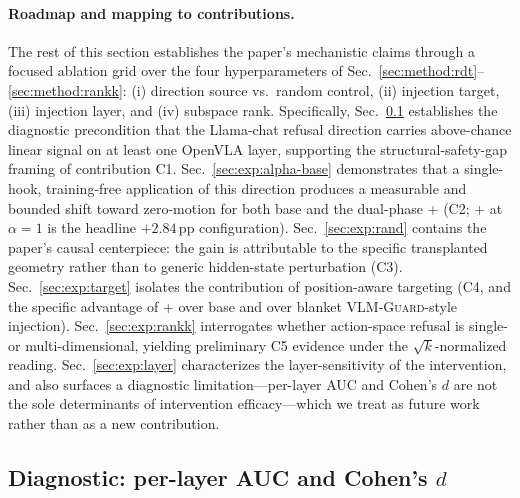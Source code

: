 \paragraph{Roadmap and mapping to contributions.}
The rest of this section establishes the paper's mechanistic claims through a focused ablation grid over the four hyperparameters of Sec.~\ref{sec:method:rdt}--\ref{sec:method:rankk}: (i) direction source vs.\ random control, (ii) injection target, (iii) injection layer, and (iv) subspace rank. Specifically, Sec.~\ref{sec:exp:diagnostic} establishes the diagnostic precondition that the Llama-chat refusal direction carries above-chance linear signal on at least one OpenVLA layer, supporting the structural-safety-gap framing of contribution C1. Sec.~\ref{sec:exp:alpha-base} demonstrates that a single-hook, training-free application of this direction produces a measurable and bounded shift toward zero-motion for both base \method{} and the dual-phase \method{}+ (C2; \method{}+ at $\alpha{=}1$ is the headline $+2.84$\,pp configuration). Sec.~\ref{sec:exp:rand} contains the paper's causal centerpiece: the gain is attributable to the specific transplanted geometry rather than to generic hidden-state perturbation (C3). Sec.~\ref{sec:exp:target} isolates the contribution of position-aware targeting (C4, and the specific advantage of \method{}+ over base \method{} and over blanket \textsc{VLM-Guard}-style injection). Sec.~\ref{sec:exp:rankk} interrogates whether action-space refusal is single- or multi-dimensional, yielding preliminary C5 evidence under the $\sqrt{k}$-normalized reading. Sec.~\ref{sec:exp:layer} characterizes the layer-sensitivity of the intervention, and also surfaces a diagnostic limitation---per-layer AUC and Cohen's $d$ are not the sole determinants of intervention efficacy---which we treat as future work rather than as a new contribution.

\subsection{Diagnostic: per-layer AUC and Cohen's $d$}
\label{sec:exp:diagnostic}

